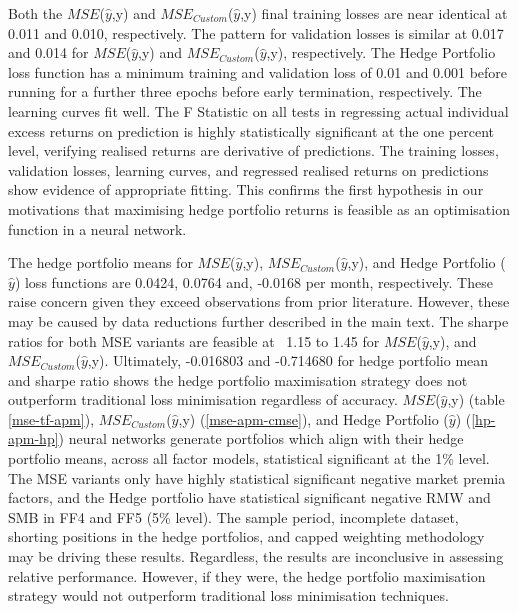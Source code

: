 Both the $MSE$($\hat{y}$,y) and $MSE_{Custom}$($\hat{y}$,y) final training losses are near identical at 0.011 and 0.010, respectively.
The pattern for validation losses is similar at 0.017 and 0.014 for $MSE$($\hat{y}$,y) and $MSE_{Custom}$($\hat{y}$,y), respectively.
The Hedge Portfolio loss function has a minimum training and validation loss of 0.01 and 0.001 before running for a further three epochs before early termination, respectively.
The learning curves fit well.
The F Statistic on all tests in regressing actual individual excess returns on prediction is highly statistically significant at the one percent level, 
verifying realised returns are derivative of predictions.
The training losses, validation losses, learning curves, and regressed realised returns on predictions show evidence of appropriate fitting.
This confirms the first hypothesis in our motivations that maximising hedge portfolio returns is feasible as an optimisation function in a neural network.

The hedge portfolio means for $MSE$($\hat{y}$,y), $MSE_{Custom}$($\hat{y}$,y), and Hedge Portfolio ($\hat{y}$) loss functions are 0.0424, 0.0764 and, -0.0168 per month, respectively.
These raise concern given they exceed observations from prior literature. However, these may be caused by data reductions further described in the main text.
The sharpe ratios for both MSE variants are feasible at ~1.15 to 1.45 for $MSE$($\hat{y}$,y), and $MSE_{Custom}$($\hat{y}$,y).
Ultimately, -0.016803 and -0.714680 for hedge portfolio mean and sharpe ratio shows the hedge portfolio maximisation strategy does not outperform traditional loss minimisation regardless of accuracy.
$MSE$($\hat{y}$,y) (table \ref{mse-tf-apm}), $MSE_{Custom}$($\hat{y}$,y) (\ref{mse-apm-cmse}), and Hedge Portfolio ($\hat{y}$) (\ref{hp-apm-hp}) neural networks generate portfolios which align with their hedge portfolio means, across all factor models, statistical significant at the 1\% level.
The MSE variants only have highly statistical significant negative market premia factors, and the Hedge portfolio have statistical significant negative RMW and SMB in FF4 and FF5 (5\% level).
The sample period, incomplete dataset, shorting positions in the hedge portfolios, and capped weighting methodology may be driving these results.
Regardless, the results are inconclusive in assessing relative performance.
However, if they were, the hedge portfolio maximisation strategy would not outperform traditional loss minimisation techniques.

